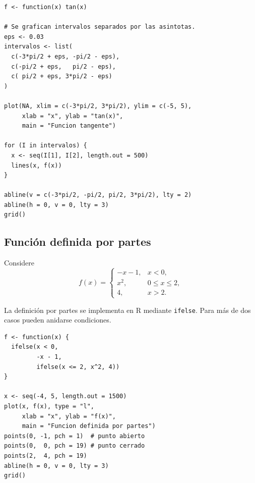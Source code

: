 \documentclass[12pt]{article}
\theoremstyle{remark}
\begin{document}
\begin{verbatim}
f <- function(x) tan(x)

# Se grafican intervalos separados por las asintotas.
eps <- 0.03
intervalos <- list(
  c(-3*pi/2 + eps, -pi/2 - eps),
  c(-pi/2 + eps,   pi/2 - eps),
  c( pi/2 + eps, 3*pi/2 - eps)
)

plot(NA, xlim = c(-3*pi/2, 3*pi/2), ylim = c(-5, 5),
     xlab = "x", ylab = "tan(x)",
     main = "Funcion tangente")

for (I in intervalos) {
  x <- seq(I[1], I[2], length.out = 500)
  lines(x, f(x))
}

abline(v = c(-3*pi/2, -pi/2, pi/2, 3*pi/2), lty = 2)
abline(h = 0, v = 0, lty = 3)
grid()
\end{verbatim}

\subsection{Función definida por partes}

Considere
\[
f(x)=
\begin{cases}
-x-1,&x<0,\\
x^2,&0\leq x\leq2,\\
4,&x>2.
\end{cases}
\]

La definición por partes se implementa en R mediante \texttt{ifelse}. Para más
de dos casos pueden anidarse condiciones.

\begin{center}
\end{center}

\begin{verbatim}
f <- function(x) {
  ifelse(x < 0,
         -x - 1,
         ifelse(x <= 2, x^2, 4))
}

x <- seq(-4, 5, length.out = 1500)
plot(x, f(x), type = "l",
     xlab = "x", ylab = "f(x)",
     main = "Funcion definida por partes")
points(0, -1, pch = 1)  # punto abierto
points(0,  0, pch = 19) # punto cerrado
points(2,  4, pch = 19)
abline(h = 0, v = 0, lty = 3)
grid()
\end{verbatim}
\end{document}
